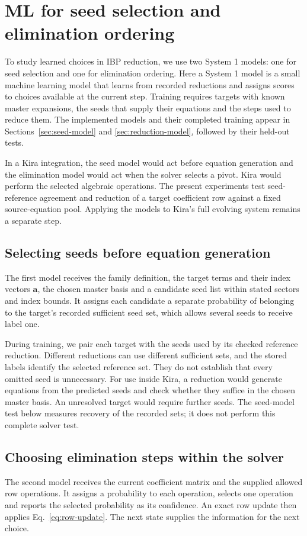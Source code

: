 \section{ML for seed selection and elimination ordering}
\label{sec:ml-roles}
To study learned choices in IBP reduction, we use two System 1
models: one for seed selection and one for elimination ordering.
Here a System 1 model is a small machine learning model that learns
from recorded reductions and assigns scores to choices available at
the current step. Training requires targets with known master
expansions, the seeds that supply their equations and the steps used
to reduce them. The implemented models and their completed training
appear in Sections~\ref{sec:seed-model} and
\ref{sec:reduction-model}, followed by their held-out tests.

In a Kira integration, the seed model would act before equation
generation and the elimination model would act when the solver
selects a pivot. Kira would perform the selected algebraic operations.
The present experiments test seed-reference agreement and reduction
of a target coefficient row against a fixed source-equation pool.
Applying the models to Kira's full evolving system remains a separate
step.

\subsection{Selecting seeds before equation generation}
The first model receives the family definition, the target terms and
their index vectors $\boldsymbol a$, the chosen master basis and a
candidate seed list within stated sectors and index bounds. It
assigns each candidate a separate probability of belonging to the
target's recorded sufficient seed set, which allows several seeds
to receive label one.

During training, we pair each target with the seeds used by its
checked reference reduction. Different reductions can use different
sufficient sets, and the stored labels identify the selected reference
set. They do not establish that every omitted seed is unnecessary.
For use inside Kira, a reduction would generate equations from the
predicted seeds and check whether they suffice in the chosen master
basis. An unresolved target would require further seeds. The
seed-model test below measures recovery of the recorded sets; it
does not perform this complete solver test.

\subsection{Choosing elimination steps within the solver}
The second model receives the current coefficient matrix and the
supplied allowed row operations. It assigns a probability to each
operation, selects one operation and reports the selected
probability as its confidence. An exact row update then applies
Eq.~\eqref{eq:row-update}. The next state supplies the information
for the next choice.

